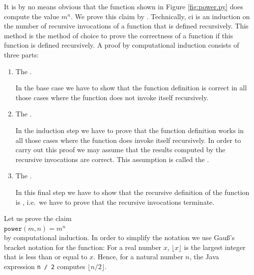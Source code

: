 It is by no means obvious that the function shown in Figure \ref{fig:power.py} does compute the value
$m^n$.  We prove this claim by  .
Technically, \gls{ci} is an induction on the number of recursive invocations of a function that is defined recursively.
This method is the method of choice to prove the correctness of a function if this function is defined recursively.
A proof by computational induction consists of three parts:

\begin{enumerate}
\item The .

      In the base case we have to show that the function definition is correct in all those cases where the function
      does not invoke itself recursively.
\item The .

      In the induction step we have to prove that the function definition works in all those cases where
      the function does invoke itself recursively.  In order to carry out this proof we may
      assume that the results computed by the recursive invocations are correct.
      This assumption is called the .
\item The .

      In this final step we have to show that the recursive definition of the function is ,
      i.e.~we have to prove that the recursive invocations terminate.
\end{enumerate}
Let us prove the claim 
\\[0.2cm]
\hspace*{1.3cm}
 $\mathtt{power}(m,n) = m^n$
\\[0.2cm] 
by computational induction.  In order to simplify the notation we use Gauß's bracket notation for the
 function:  For a real number $x$, $\lfloor x \rfloor$ is the largest integer that is less
than or equal to $x$.  Hence, for a natural number $n$, the Java expression \texttt{n / 2} computes
$\lfloor n / 2 \rfloor$.
\\[0.2cm]\mbox{}
